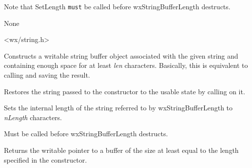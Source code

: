 Note that SetLength {\tt must} be called before wxStringBufferLength destructs.


None


<wx/string.h>



\label{wxstringbufferlengthctor}


Constructs a writable string buffer object associated with the given string
and containing enough space for at least {\it len} characters. Basically, this
is equivalent to calling  and
saving the result.


\label{wxstringbufferlengthdtor}


Restores the string passed to the constructor to the usable state by calling 
 on it.


\label{wxstringbufferlengthsetlength}


Sets the internal length of the string referred to by wxStringBufferLength to 
{\it nLength} characters.

Must be called before wxStringBufferLength destructs.


\label{wxstringbufferlengthwxchar}


Returns the writable pointer to a buffer of the size at least equal to the
length specified in the constructor.


